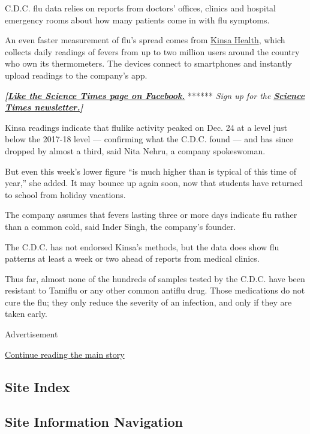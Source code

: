 C.D.C. flu data relies on reports from doctors' offices, clinics and
hospital emergency rooms about how many patients come in with flu
symptoms.

An even faster measurement of flu's spread comes from
\href{https://www.nytimes3xbfgragh.onion/2018/01/16/health/smart-thermometers-flu.html}{Kinsa
Health}, which collects daily readings of fevers from up to two million
users around the country who own its thermometers. The devices connect
to smartphones and instantly upload readings to the company's app.

\textbf{\emph{{[}}\href{http://on.fb.me/1paTQ1h}{\emph{Like the Science
Times page on Facebook.}}} ****** \emph{\textbar{} Sign up for the}
\textbf{\href{http://nyti.ms/1MbHaRU}{\emph{Science Times
newsletter.}}\emph{{]}}}

Kinsa readings indicate that flulike activity peaked on Dec. 24 at a
level just below the 2017-18 level --- confirming what the C.D.C. found
--- and has since dropped by almost a third, said Nita Nehru, a company
spokeswoman.

But even this week's lower figure ``is much higher than is typical of
this time of year,'' she added. It may bounce up again soon, now that
students have returned to school from holiday vacations.

The company assumes that fevers lasting three or more days indicate flu
rather than a common cold, said Inder Singh, the company's founder.

The C.D.C. has not endorsed Kinsa's methods, but the data does show flu
patterns at least a week or two ahead of reports from medical clinics.

Thus far, almost none of the hundreds of samples tested by the C.D.C.
have been resistant to Tamiflu or any other common antiflu drug. Those
medications do not cure the flu; they only reduce the severity of an
infection, and only if they are taken early.

Advertisement

\protect\hyperlink{after-bottom}{Continue reading the main story}

\hypertarget{site-index}{%
\subsection{Site Index}\label{site-index}}

\hypertarget{site-information-navigation}{%
\subsection{Site Information
Navigation}\label{site-information-navigation}}

